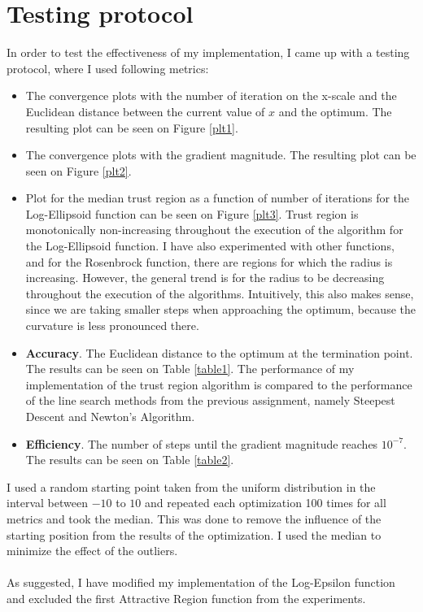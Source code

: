 \documentclass[a4paper]{article}
\begin{document}
\section{Testing protocol}
In order to test the effectiveness of my implementation, I came up with a
testing protocol, where I used following metrics:
\begin{itemize}
\item The convergence plots with the number of iteration on the x-scale and the
  Euclidean distance between the current value of $x$ and the
  optimum. The resulting plot can be seen on Figure \ref{plt1}.
\item The convergence plots with the gradient magnitude.
  The resulting plot can be seen on Figure \ref{plt2}. 
\item Plot for the median trust region as a function of number of iterations for
  the Log-Ellipsoid function can be seen on Figure \ref{plt3}. Trust region is
  monotonically non-increasing throughout the execution of the algorithm for the
  Log-Ellipsoid function. I have also experimented with other functions, and for
  the Rosenbrock function, there are regions for which the radius is increasing.
  However, the general trend is for the radius to be decreasing throughout the
  execution of the algorithms. Intuitively, this also makes sense, since we are
  taking smaller steps when approaching the optimum, because the curvature is
  less pronounced there.
\item \textbf{Accuracy}. The Euclidean distance to the optimum at the
  termination point. The results can be seen on Table \ref{table1}.
  The performance of my implementation of the trust
  region algorithm is compared to the performance of the line search methods
  from the previous assignment, namely Steepest Descent and Newton's Algorithm.
\item \textbf{Efficiency}. The number of steps until the gradient
  magnitude reaches $10^{-7}$. The results can be seen on Table \ref{table2}.
\end{itemize}
I used a random starting point taken from the uniform distribution in the
interval between $-10$ to $10$ and repeated each optimization 100 times for all
metrics and took the median. This was done to remove the influence of the
starting position from the results of the optimization. I used the median
to minimize the effect of the outliers. \\\\
As suggested, I have modified my implementation of the Log-Epsilon function and
excluded the first Attractive Region function from the experiments.
\end{document}
